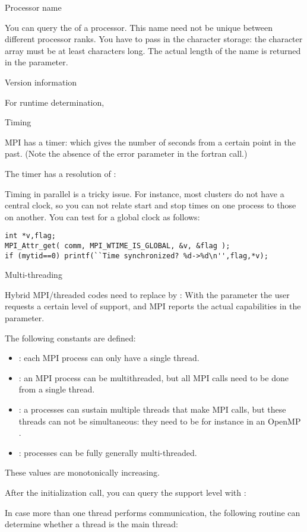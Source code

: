  {Processor name}

You can query the  of a processor.
This name need not be unique between different processor ranks.
%
%
You have to pass in the character storage:
the character array must be at least  characters long.
The actual length of the name is returned in the  parameter.

 {Version information}


For runtime determination,
%

 {Timing}
\label{sec:ref:mpi-timing}

MPI has a  timer: 
%
%
which gives the number of seconds from a certain point in the past.
(Note the absence of the error parameter in the fortran call.)

The timer has a resolution of :
%

Timing in parallel is a tricky issue. For instance, most clusters do
not have a central clock, so you can not relate start and stop times
on one process to those on another. You can test for a global clock as
follows:
\begin{lstlisting}
int *v,flag;
MPI_Attr_get( comm, MPI_WTIME_IS_GLOBAL, &v, &flag );
if (mytid==0) printf(``Time synchronized? %d->%d\n'',flag,*v);
\end{lstlisting}


 {Multi-threading}
\label{sec:ref:mpi-thread}

Hybrid MPI/threaded codes need to replace 
by :
%
%
With the  parameter the user requests a certain level of support,
and MPI reports the actual capabilities in the  parameter.

The following constants are defined:
\begin{itemize}
\item {}: each MPI process can only have
  a single thread.
\item {}: an MPI process can be
  multithreaded, but all MPI calls need to be done from a single
  thread.
\item {}: a processes can sustain
  multiple threads that make MPI calls, but these threads can not be
  simultaneous: they need to be for instance in an OpenMP
  .
\item {}: processes can be fully
  generally multi-threaded.
\end{itemize}
These values are monotonically increasing.

After the initialization call, you can query the support level
with :
%

In case more than one thread performs communication, the following routine
can determine whether a thread is the main thread:
%
